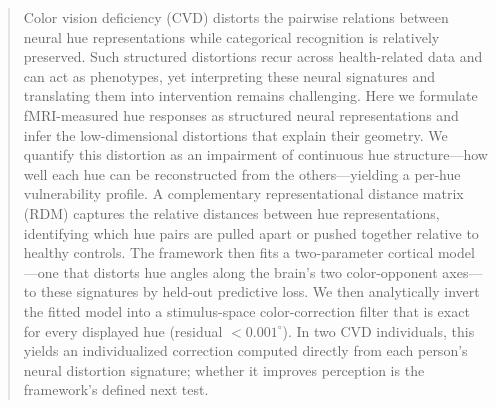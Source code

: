 \documentclass{article}
\begin{document}

\printAffiliationsAndNotice{}

\begin{abstract}
Color vision deficiency (CVD) distorts the pairwise relations between neural hue representations while categorical recognition is relatively preserved.
Such structured distortions recur across health-related data and can act as phenotypes, yet interpreting these neural signatures and translating them into intervention remains challenging.
Here we formulate fMRI-measured hue responses as structured neural representations and infer the low-dimensional distortions that explain their geometry.
We quantify this distortion as an impairment of continuous hue structure---how well each hue can be reconstructed from the others---yielding a per-hue vulnerability profile.
A complementary representational distance matrix (RDM) captures the relative distances between hue representations, identifying which hue pairs are pulled apart or pushed together relative to healthy controls.
The framework then fits a two-parameter cortical model---one that distorts hue angles along the brain's two color-opponent axes---to these signatures by held-out predictive loss.
We then analytically invert the fitted model into a stimulus-space color-correction filter that is exact for every displayed hue (residual $<0.001^\circ$).
In two CVD individuals, this yields an individualized correction computed directly from each person's neural distortion signature; whether it improves perception is the framework's defined next test.
\end{abstract}
\end{document}
